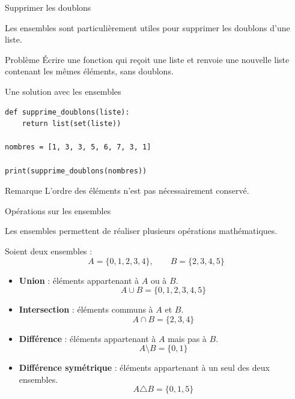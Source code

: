\documentclass[10pt]{beamer}
\begin{document}
\begin{frame}[fragile]{Supprimer les doublons}

Les ensembles sont particulièrement utiles pour supprimer
les doublons d'une liste.

\begin{block}{Problème}
\small
Écrire une fonction qui reçoit une liste et renvoie une
nouvelle liste contenant les mêmes éléments, sans doublons.
\end{block}

\pause

\begin{exampleblock}{Une solution avec les ensembles}
\small
\begin{lstlisting}
def supprime_doublons(liste):
    return list(set(liste))

nombres = [1, 3, 3, 5, 6, 7, 3, 1]

print(supprime_doublons(nombres))
\end{lstlisting}
\end{exampleblock}

\begin{alertblock}{Remarque}
\small
L'ordre des éléments n'est pas nécessairement conservé.
\end{alertblock}

\end{frame}
\begin{frame}{Opérations sur les ensembles}

Les ensembles permettent de réaliser plusieurs opérations
mathématiques.

Soient deux ensembles :
\[
A = \{0,1,2,3,4\}, \qquad
B = \{2,3,4,5\}
\]

\begin{itemize}
    \item \textbf{Union} : éléments appartenant à $A$ ou à $B$.
    \[
    A \cup B = \{0,1,2,3,4,5\}
    \]

    \item \textbf{Intersection} : éléments communs à $A$ et $B$.
    \[
    A \cap B = \{2,3,4\}
    \]

    \item \textbf{Différence} : éléments appartenant à $A$
    mais pas à $B$.
    \[
    A \setminus B = \{0,1\}
    \]

    \item \textbf{Différence symétrique} : éléments appartenant
    à un seul des deux ensembles.
    \[
    A \triangle B = \{0,1,5\}
    \]
\end{itemize}

\end{frame}
\end{document}
